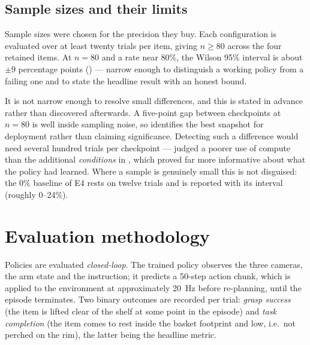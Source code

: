 \subsection{Sample sizes and their limits}
\label{sec:m-power}
Sample sizes were chosen for the precision they buy. Each configuration is evaluated
over at least twenty trials per item, giving $n\ge 80$ across the four retained items.
At $n=80$ and a rate near 80\%, the Wilson 95\% interval is about $\pm 9$ percentage
points () --- narrow enough to distinguish a working policy from a
failing one and to state the headline result with an honest bound.

It is not narrow enough to resolve small differences, and this is stated in advance
rather than discovered afterwards. A five-point gap between checkpoints at $n=80$ is
well inside sampling noise, so  identifies the best
snapshot for deployment rather than claiming significance. Detecting such a difference
would need several hundred trials per checkpoint --- judged a poorer use of compute than
the additional \emph{conditions} in , which proved far more
informative about what the policy had learned. Where a sample is genuinely small this is
not disguised: the 0\% baseline of E4 rests on twelve trials and is reported with its
interval (roughly 0--24\%).

\section{Evaluation methodology}
\label{sec:m-eval}
Policies are evaluated \emph{closed-loop}. The trained policy observes the three
cameras, the arm state and the instruction; it predicts a 50-step action chunk,
which is applied to the environment at approximately \SI{20}{Hz} before
re-planning, until the episode terminates. Two binary outcomes are recorded per
trial: \emph{grasp success} (the item is lifted clear of the shelf at some point in
the episode) and \emph{task completion} (the item comes to rest inside the basket
footprint and low, i.e.\ not perched on the rim), the latter being the headline
metric.

